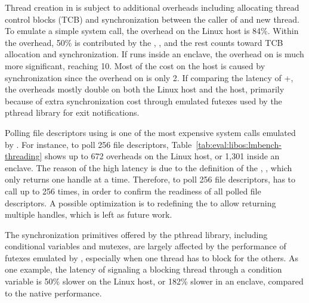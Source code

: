 \label{sec:eval:libos:threading}


\begin{table}[t!b!]

\caption{Performance of threading and scheduling operations, including cloning a thread, polling file descriptors, and synchronization primitives (signaling a conditional variable, acquiring a mutex). The comparison is among (1) native Linux processes; (2) \graphene{} on Linux host, both without and with \seccomp{} filter ({\bf +SC}) and reference monitor ({\bf +RM}); (3) \graphenesgx{}.
System call latency is in microseconds, and lower is better.
Overheads are relative to Linux; negative overheads indicate improvement.} 
\label{tab:eval:libos:lmbench-threading}
\end{table}


Thread creation in \thelibos{}
is subject to additional overheads including allocating thread control blocks (TCB)
and synchronization between the caller of  and new thread.
To emulate a simple  system call, the overhead on the Linux host is \roughly{}84\%.
Within the overhead, 50\% is contributed
by the \hostapi{}, , and the rest counts toward
TCB allocation and synchronization.
If \thelibos{} runs inside an enclave,
the overhead on  is much more significant, reaching \roughly{}10\x{}.
Most of the cost on the \sgx{} host
is caused by synchronization since the overhead on  is only 2\x{}.
If comparing the latency of +, the overheads mostly double on both the Linux host and the \sgx{} host,
primarily because of extra synchronization cost
through emulated futexes
used by the pthread library for exit notifications.



Polling file descriptors using  is one of the most expensive system calls
emulated by \thelibos{}.
For instance, to poll 256 file descriptors,
Table~\ref{tab:eval:libos:lmbench-threading} shows up to 672\x{} overheads on the Linux host, or 1,301\x{} inside an enclave.
The reason of the high latency
is due to the definition of the \hostapi{}, ,
which only returns one handle at a time.
Therefore, to poll 256 file descriptors,
\thelibos{} has to call  up to 256 times, in order to confirm
the readiness of all polled file descriptors.
A possible optimization
is to redefining the \hostapi{} to allow returning multiple handles,
which is left as future work.


The synchronization primitives offered by the pthread library,
including conditional variables and mutexes, 
are largely affected by the performance of futexes emulated by \thelibos{},
especially when one thread has to block for the others.
As one example,
the latency of signaling a blocking thread
through a condition variable
is 50\% slower on the Linux host, or 182\% slower in an enclave,
compared to the native performance.





